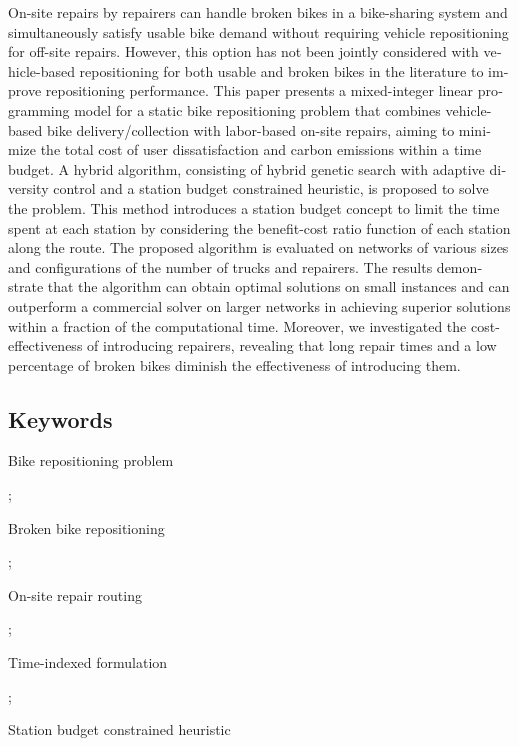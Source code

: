 \documentclass[
  english,
]{article}
\begin{document}
\begin{otherlanguage}{english}
\protect{}\label{as010}
\protect{}\label{sp0010}
On-site repairs by repairers can handle broken bikes in a bike-sharing system and simultaneously
satisfy usable bike demand without requiring vehicle repositioning for off-site repairs. However,
this option has not been jointly considered with vehicle-based repositioning for both usable and
broken bikes in the literature to improve repositioning performance. This paper presents a
mixed-integer linear programming model for a static bike repositioning problem that combines
vehicle-based bike delivery/collection with labor-based on-site repairs, aiming to minimize the
total cost of user dissatisfaction and carbon emissions within a time budget. A hybrid algorithm,
consisting of hybrid genetic search with adaptive diversity control and a station budget constrained
heuristic, is proposed to solve the problem. This method introduces a station budget concept to
limit the time spent at each station by considering the benefit-cost ratio function of each station
along the route. The proposed algorithm is evaluated on networks of various sizes and configurations
of the number of trucks and repairers. The results demonstrate that the algorithm can obtain optimal
solutions on small instances and can outperform a commercial solver on larger networks in achieving
superior solutions within a fraction of the computational time. Moreover, we investigated the
cost-effectiveness of introducing repairers, revealing that long repair times and a low percentage
of broken bikes diminish the effectiveness of introducing them.

\protect{}\label{kg005}
\subsection{Keywords}\label{keywords}

\protect{}\label{k0005}
Bike repositioning problem

;

\protect{}\label{k0010}
Broken bike repositioning

;

\protect{}\label{k0015}
On-site repair routing

;

\protect{}\label{k0020}
Time-indexed formulation

;

\protect{}\label{k0025}
Station budget constrained heuristic


\end{otherlanguage}
\end{document}
